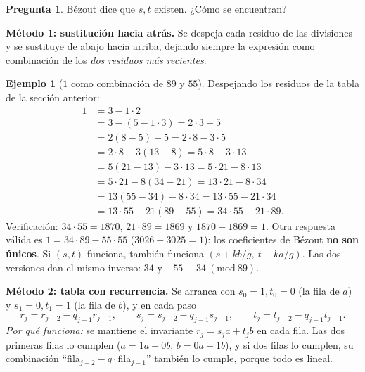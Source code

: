 \documentclass[11pt,a4paper]{article}
\theoremstyle{definition}
\newtheorem{ejemplo}[teorema]{Ejemplo}
\newcommand{\md}[1]{\ (\mathrm{mod}\ #1)}
\theoremstyle{notait}
\newtheorem*{pregunta}{Pregunta}
\theoremstyle{nota}
\begin{document}
\begin{pregunta}
Bézout dice que $s,t$ existen. ¿Cómo se encuentran?
\end{pregunta}

\textbf{Método 1: sustitución hacia atrás.} Se despeja cada residuo de las divisiones y se sustituye de abajo hacia arriba, dejando siempre la expresión como combinación de los \emph{dos residuos más recientes}.

\begin{ejemplo}[$1$ como combinación de $89$ y $55$]
Despejando los residuos de la tabla de la sección anterior:
\[
\begin{aligned}
1 &= 3-1\cdot 2\\
  &= 3-(5-1\cdot 3)= 2\cdot 3-5\\
  &= 2(8-5)-5 = 2\cdot 8-3\cdot 5\\
  &= 2\cdot 8-3(13-8) = 5\cdot 8-3\cdot 13\\
  &= 5(21-13)-3\cdot13 = 5\cdot 21-8\cdot 13\\
  &= 5\cdot21-8(34-21) = 13\cdot 21-8\cdot 34\\
  &= 13(55-34)-8\cdot34 = 13\cdot 55-21\cdot 34\\
  &= 13\cdot55-21(89-55) = 34\cdot 55-21\cdot 89.
\end{aligned}
\]
Verificación: $34\cdot55=1870$, $21\cdot 89=1869$ y $1870-1869=1$. Otra respuesta válida es $1=34\cdot89-55\cdot55$ ($3026-3025=1$): los coeficientes de Bézout \textbf{no son únicos}. Si $(s,t)$ funciona, también funciona $(s+kb/g,\ t-ka/g)$. Las dos versiones dan el mismo inverso: $34$ y $-55\equiv34\md{89}$.
\end{ejemplo}

\textbf{Método 2: tabla con recurrencia.} Se arranca con $s_0=1,t_0=0$ (la fila de $a$) y $s_1=0,t_1=1$ (la fila de $b$), y en cada paso
\[
r_j=r_{j-2}-q_{j-1}r_{j-1},\qquad s_j=s_{j-2}-q_{j-1}s_{j-1},\qquad t_j=t_{j-2}-q_{j-1}t_{j-1}.
\]
\emph{Por qué funciona:} se mantiene el invariante $r_j=s_ja+t_jb$ en cada fila. Las dos primeras filas lo cumplen ($a=1a+0b$, $b=0a+1b$), y si dos filas lo cumplen, su combinación ``fila$_{j-2}-q\cdot$fila$_{j-1}$'' también lo cumple, porque todo es lineal.
\end{document}
